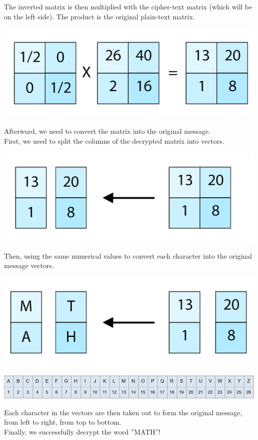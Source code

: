 \documentclass[11pt]{article}
\begin{document}
\begin{subs}
The inverted matrix is then multiplied with the cipher-text matrix (which will be on the left side). The product is the original plain-text matrix.
\begin{center} \includegraphics[scale=0.2]{multiply_2} \end{center}\vspace{5mm}

Afterward, we need to convert the matrix into the original message.\\
First, we need to split the columns of the decrypted matrix into vectors.
\begin{center} \includegraphics[scale=0.2]{linear_2} \end{center}\vspace{5mm}
Then, using the same numerical values to convert each character into the original message vectors.
\begin{center} \includegraphics[scale=0.2]{math_2} \end{center}\vspace{5mm}
\begin{center} \includegraphics[scale=0.35]{numerical} \end{center}\vspace{5mm}

Each character in the vectors are then taken out to form the original message, from left to right, from top to bottom.\vspace{10mm}\\
Finally, we successfully decrypt the word ''MATH''!
\end{subs}
\end{document}
